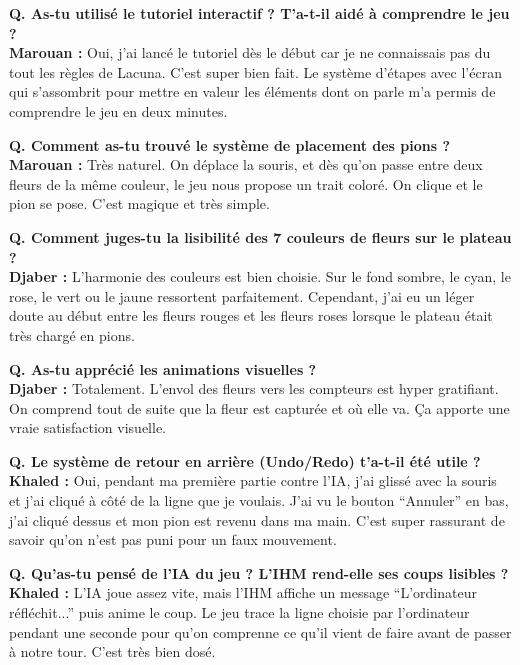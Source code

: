 \documentclass[11pt,a4paper]{article}
\begin{document}
\begin{tcolorbox}[nongamerbox, title={Marouan -- 25 ans, étudiant en lettres}]
    \textbf{Q. As-tu utilisé le tutoriel interactif ? T'a-t-il aidé à comprendre le jeu ?}\\
    \textbf{Marouan :} Oui, j'ai lancé le tutoriel dès le début car je ne connaissais pas du tout les règles de Lacuna. C'est super bien fait. Le système d'étapes avec l'écran qui s'assombrit pour mettre en valeur les éléments dont on parle m'a permis de comprendre le jeu en deux minutes.

    \textbf{Q. Comment as-tu trouvé le système de placement des pions ?}\\
    \textbf{Marouan :} Très naturel. On déplace la souris, et dès qu'on passe entre deux fleurs de la même couleur, le jeu nous propose un trait coloré. On clique et le pion se pose. C'est magique et très simple.
\end{tcolorbox}

\begin{tcolorbox}[nongamerbox, title={Djaber -- 23 ans, étudiant en design graphique}]
    \textbf{Q. Comment juges-tu la lisibilité des 7 couleurs de fleurs sur le plateau ?}\\
    \textbf{Djaber :} L'harmonie des couleurs est bien choisie. Sur le fond sombre, le cyan, le rose, le vert ou le jaune ressortent parfaitement. Cependant, j'ai eu un léger doute au début entre les fleurs rouges et les fleurs roses lorsque le plateau était très chargé en pions.

    \textbf{Q. As-tu apprécié les animations visuelles ?}\\
    \textbf{Djaber :} Totalement. L'envol des fleurs vers les compteurs est hyper gratifiant. On comprend tout de suite que la fleur est capturée et où elle va. Ça apporte une vraie satisfaction visuelle.
\end{tcolorbox}

\begin{tcolorbox}[nongamerbox, title={Khaled -- 24 ans, alternant en commerce}]
    \textbf{Q. Le système de retour en arrière (Undo/Redo) t'a-t-il été utile ?}\\
    \textbf{Khaled :} Oui, pendant ma première partie contre l'IA, j'ai glissé avec la souris et j'ai cliqué à côté de la ligne que je voulais. J'ai vu le bouton ``Annuler'' en bas, j'ai cliqué dessus et mon pion est revenu dans ma main. C'est super rassurant de savoir qu'on n'est pas puni pour un faux mouvement.

    \textbf{Q. Qu'as-tu pensé de l'IA du jeu ? L'IHM rend-elle ses coups lisibles ?}\\
    \textbf{Khaled :} L'IA joue assez vite, mais l'IHM affiche un message ``L'ordinateur réfléchit...'' puis anime le coup. Le jeu trace la ligne choisie par l'ordinateur pendant une seconde pour qu'on comprenne ce qu'il vient de faire avant de passer à notre tour. C'est très bien dosé.
\end{tcolorbox}
\end{document}

